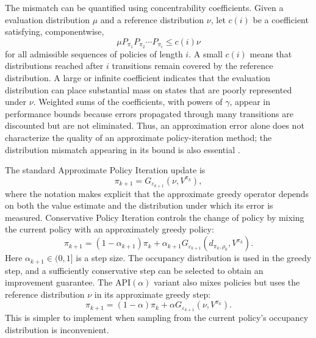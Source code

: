 The mismatch can be quantified using concentrability coefficients. Given a
evaluation distribution $\mu$ and a reference distribution $\nu$, let $c(i)$ be
a coefficient satisfying, componentwise,
\begin{equation}
    \mu P_{\pi_1}P_{\pi_2}\cdots P_{\pi_i}
    \leq c(i)\nu
    \label{eq:rl-concentrability}
\end{equation}
for all admissible sequences of policies of length $i$. A small $c(i)$ means
that distributions reached after $i$ transitions remain covered by the
reference distribution. A large or infinite coefficient indicates that the
evaluation distribution can place substantial mass on states that are poorly
represented under $\nu$. Weighted sums of the coefficients, with powers of
$\gamma$, appear in performance bounds because errors propagated through many
transitions are discounted but are not eliminated. Thus, an approximation error
alone does not characterize the quality of an approximate policy-iteration
method; the distribution mismatch appearing in its bound is also essential
\parencite{scherrer2014approximate}.

The standard Approximate Policy Iteration update is
\begin{equation}
    \pi_{k+1}
    =G_{\varepsilon_{k+1}}(\nu,V^{\pi_k}),
    \label{eq:rl-api}
\end{equation}
where the notation makes explicit that the approximate greedy operator depends
on both the value estimate and the distribution under which its error is
measured. Conservative Policy Iteration controls the change of policy by
mixing the current policy with an approximately greedy policy:
\begin{equation}
    \pi_{k+1}
    =(1-\alpha_{k+1})\pi_k
      +\alpha_{k+1}
      G_{\varepsilon_{k+1}}(d_{\pi_k,\rho_0},V^{\pi_k}).
    \label{eq:rl-cpi}
\end{equation}
Here $\alpha_{k+1}\in(0,1]$ is a step size. The occupancy distribution is used
in the greedy step, and a sufficiently conservative step can be selected to
obtain an improvement guarantee. The API$(\alpha)$ variant also mixes policies but uses the reference
distribution $\nu$ in its approximate greedy step:
\begin{equation}
    \pi_{k+1}=(1-\alpha)\pi_k
       +\alpha G_{\varepsilon_{k+1}}(\nu,V^{\pi_k}).
    \label{eq:rl-api-alpha}
\end{equation}
This is simpler to implement when sampling from the current policy's
occupancy distribution is inconvenient.

